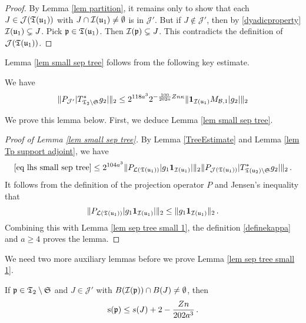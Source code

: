 {    \begin{proof}
        By Lemma \ref{lem partition}, it remains only to show that each $J \in \mathcal{J}(\mathfrak T(\mathfrak u_1))$ with $J \cap \mathcal{I}(\mathfrak u_1) \ne \emptyset$ is in $\mathcal{J}'$. But if $J \notin \mathcal{J}'$, then by \eqref{dyadicproperty} $\mathcal{I}(\mathfrak u_1) \subsetneq J$. Pick $\mathfrak p \in \mathfrak T(\mathfrak u_1)$.  Then $\mathcal{I}(\mathfrak p) \subsetneq J$. This contradicts the definition of $\mathcal{J}(\mathfrak T(\mathfrak u_1))$.
    \end{proof}

    Lemma \ref{lem small sep tree} follows from the following key estimate.

    \begin{lemma}
        \label{lem sep tree small 1}
        We have
        $$
            \|P_{\mathcal{J}'}|T_{\mathfrak{T}_2 \setminus \mathfrak{S}}^* g_2|\|_2
            \le 2^{118a^3} 2^{-\frac{100}{202a}Zn\kappa} \|\mathbf{1}_{\mathcal{I}(\mathfrak u_1)} M_{\mathcal{B},1} |g_2|\|_2
        $$
    \end{lemma}

    We prove this lemma below. First, we deduce Lemma \ref{lem small sep tree}.

    \begin{proof}[Proof of Lemma \ref{lem small sep tree}]
        By Lemma \ref{TreeEstimate} and Lemma \ref{lem Tp support adjoint}, we have
        \begin{align*}
            \eqref{eq lhs small sep tree} \le 2^{104a^3} \|P_{\mathcal{L}(\mathfrak T(\mathfrak u_1))} |g_1\mathbf{1}_{\mathcal{I}(\mathfrak u_1)}| \|_2 \|P_{\mathcal{J}(\mathfrak T(\mathfrak u_1) )}|T_{\mathfrak T(\mathfrak u_2) \setminus \mathfrak{S}}^* g_2|\|_2\,.
        \end{align*}
        It follows from the definition of the projection operator $P$ and Jensen's inequality that
        $$
            \|P_{\mathcal{L}(\mathfrak T(\mathfrak u_1))} |g_1\mathbf{1}_{\mathcal{I}(\mathfrak u_1)}| \|_2 \le \|g_1 \mathbf{1}_{\mathcal{I}(\mathfrak u_1)}\|_2\,.
        $$
        Combining this with Lemma \ref{lem sep tree small 1}, the definition \eqref{definekappa} and $a \ge 4$ proves the lemma.
    \end{proof}

    We need two more auxiliary lemmas before we prove Lemma \ref{lem sep tree small 1}.

    \begin{lemma}
        \label{lem sep aux 3}
        If $\mathfrak p \in \mathfrak T_2 \setminus \mathfrak{S}$ and $J \in \mathcal{J'}$ with $B(\mathcal{I}(\mathfrak p)) \cap B(J) \ne \emptyset$, then
        $$
            \mathrm{s}(\mathfrak p) \le s(J) + 2 - \frac{Zn}{202a^3}\,.
        $$
    \end{lemma}

}
